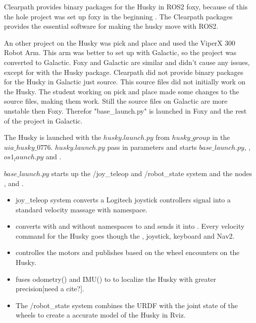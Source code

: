 Clearpath provides binary packages for the Husky in ROS2 foxy, because of this the hole project was set up foxy in the beginning . The Clearpath packages provides the essential software for making the husky move with ROS2.

An other project on the Husky was pick and place and used the ViperX 300 Robot Arm. This arm was better to set up with Galactic, so the project was converted to Galactic. Foxy and Galactic are similar and didn't cause any issues, except for with the Husky package. Clearpath did not provide binary packages for the Husky in Galactic just source. This source files did not initially work on the Husky. The student working on pick and place made some changes to the source files, making them work. Still the source files on Galactic are more unstable then Foxy. Therefor "base\_launch.py" is launched in Foxy and the rest of the project in Galactic. 

The Husky is launched with the $husky.launch.py$ from $husky\_group$ in the $uia\_husky\_0776$. $husky.launch.py$ pass in parameters and starts $base\_launch.py$, , $os1_launch.py$ and . 

$base\_launch.py$ starts up the /joy\_teleop and /robot\_state system and the nodes ,  and . 

\begin{itemize}
    \item joy\_teleop system converts a Logitech joystick controllers signal into  a standard velocity massage with namespace. 
    
    \item {} converts  with and without namespaces to  and sends it into . Every velocity command for the Husky goes though the , joystick, keyboard and Nav2. 
    
    \item {} controlles the motors and publishes  based on the wheel encounters on the Husky. 
    
    \item {} fuses odometry() and IMU() to  to localize the Husky with greater precision[need a cite?]. 
    
    \item The /robot\_state system combines the URDF with the joint state of the wheels to create a accurate model of the Husky in Rviz. 
    
\end{itemize}

